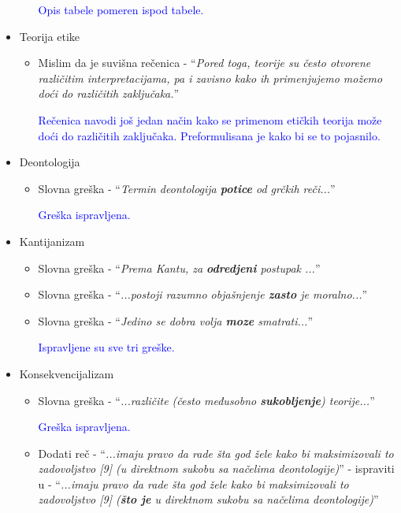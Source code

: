 \documentclass[a4paper]{report}
\newcommand{\odgovor}[1]{\textcolor{blue}{#1}}
\begin{document}
\begin{itemize}
\begin{itemize}
        \odgovor{Opis tabele pomeren ispod tabele.}
        
    \end{itemize}
    \item Teorija etike
    \begin{itemize}
        \item Mislim da je suvišna rečenica - ``\textit{Pored toga, teorije su često
otvorene različitim interpretacijama, pa i zavisno kako ih primenjujemo
možemo doći do različitih zaključaka.}''

		\odgovor{Rečenica navodi još jedan način kako se primenom etičkih teorija može doći do različitih zaključaka. Preformulisana je kako bi se to pojasnilo. }
		
    \end{itemize}
    \item Deontologija
    \begin{itemize}
        \item Slovna greška - ``\textit{Termin deontologija \textbf{potice} od grčkih reči...}''
        
        	\odgovor{Greška ispravljena.}
        	
    \end{itemize}
    \item Kantijanizam
    \begin{itemize}
        \item Slovna greška - ``\textit{Prema Kantu, za \textbf{odredjeni} postupak ...}''
        \item Slovna greška - ``\textit{...postoji razumno
objašnjenje \textbf{zasto} je moralno...}''
        \item Slovna greška - ``\textit{Jedino se dobra volja
\textbf{moze} smatrati...}''

	\odgovor{Ispravljene su sve tri greške.}
	
    \end{itemize}
    \item Konsekvencijalizam
    \begin{itemize}
        \item Slovna greška - ``\textit{...različite (često međusobno
\textbf{sukobljenje}) teorije...}''

	\odgovor{Greška ispravljena.}
	
        \item Dodati reč - ``\textit{...imaju pravo da rade šta god žele kako bi maksimizovali to
zadovoljstvo [9] (u direktnom sukobu sa načelima deontologije)}'' - ispraviti u - ``\textit{...imaju pravo da rade šta god žele kako bi maksimizovali to
zadovoljstvo [9] (\textbf{što je} u direktnom sukobu sa načelima deontologije)}''


\end{itemize}
\end{itemize}
\end{document}
